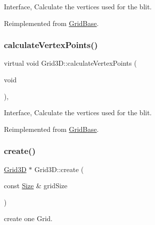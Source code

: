 Interface, Calculate the vertices used for the blit. 

Reimplemented from \hyperlink{classGridBase_a339fdde120c6f38f6bc2e78d3bb7636f}{Grid\+Base}.

\mbox{\label{classGrid3D_a062df8e14b99c36b71ff391b57de22fe}} 
\subsubsection{\texorpdfstring{calculate\+Vertex\+Points()}{calculateVertexPoints()}\hspace{0.1cm}{\footnotesize\ttfamily [2/2]}}
{\footnotesize\ttfamily virtual void Grid3\+D\+::calculate\+Vertex\+Points (\begin{DoxyParamCaption}\item[{void}]{ }\end{DoxyParamCaption})\hspace{0.3cm}{\ttfamily [override]}, {\ttfamily [virtual]}}

Interface, Calculate the vertices used for the blit. 

Reimplemented from \hyperlink{classGridBase_a339fdde120c6f38f6bc2e78d3bb7636f}{Grid\+Base}.

\mbox{\label{classGrid3D_aba8b93f0b719addc229413358ea59d56}} 
\subsubsection{\texorpdfstring{create()}{create()}\hspace{0.1cm}{\footnotesize\ttfamily [1/8]}}
{\footnotesize\ttfamily \hyperlink{classGrid3D}{Grid3D} $\ast$ Grid3\+D\+::create (\begin{DoxyParamCaption}\item[{const \hyperlink{classSize}{Size} \&}]{grid\+Size }\end{DoxyParamCaption})\hspace{0.3cm}{\ttfamily [static]}}

create one Grid. \mbox{\label{classGrid3D_a5d3460877c9ea325ae3646e6a6684e66}} 
